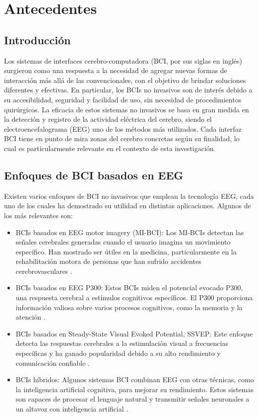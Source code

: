 \section{Antecedentes}

\subsection{Introducción}
Los sistemas de interfaces cerebro-computadora (BCI, por sus siglas en inglés) surgieron como una respuesta a la necesidad de agregar nuevas formas de interacción más allá de las convencionales, con el objetivo de brindar soluciones diferentes y efectivas. En particular, los BCIs no invasivos son de interés debido a su accesibilidad, seguridad y facilidad de uso, sin necesidad de procedimientos quirúrgicos. La eficacia de estos sistemas no invasivos se basa en gran medida en la detección y registro de la actividad eléctrica del cerebro, siendo el electroencefalograma (EEG) uno de los métodos más utilizados. Cada interfaz BCI tiene en punto de mira zonas del cerebro concretas según su finalidad, lo cual es particularmente relevante en el contexto de esta investigación.

\subsection{Enfoques de BCI basados en EEG}

Existen varios enfoques de BCI no invasivos que emplean la tecnología EEG, cada uno de los cuales ha demostrado su utilidad en distintas aplicaciones. Algunos de los más relevantes son:

\begin{itemize}
  \item BCIs basados en EEG motor imagery (MI-BCI): Los MI-BCIs detectan las señales cerebrales generadas cuando el usuario imagina un movimiento específico. Han mostrado ser útiles en la medicina, particularmente en la rehabilitación motora de personas que han sufrido accidentes cerebrovasculares \cite{MotorImageryRoboticFeedback}.
  \item BCIs basados en EEG P300: Estos BCIs miden el potencial evocado P300, una respuesta cerebral a estímulos cognitivos específicos. El P300 proporciona información valiosa sobre varios procesos cognitivos, como la memoria y la atención \cite{ComparisonAuditoryTemporalLobeEpilepsy}.
  \item BCIs basados en Steady-State Visual Evoked Potential, SSVEP: Este enfoque detecta las respuestas cerebrales a la estimulación visual a frecuencias específicas y ha ganado popularidad debido a su alto rendimiento y comunicación confiable \cite{SSVEPBCI}.
  \item BCIs híbridos: Algunos sistemas BCI combinan EEG con otras técnicas, como la inteligencia artificial cognitiva, para mejorar su rendimiento. Estos sistemas son capaces de procesar el lenguaje natural y transmitir señales neuronales a un altavoz con inteligencia artificial \cite{ThikingOutLoudOpenAccessEEGBasedBCI}.
\end{itemize}

